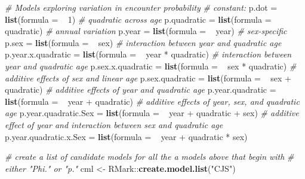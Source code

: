 \documentclass[]{article}
\newenvironment{Shaded}{\begin{snugshade}}{\end{snugshade}}
\newcommand{\KeywordTok}[1]{\textcolor[rgb]{0.13,0.29,0.53}{\textbf{{#1}}}}
\newcommand{\DataTypeTok}[1]{\textcolor[rgb]{0.13,0.29,0.53}{{#1}}}
\newcommand{\DecValTok}[1]{\textcolor[rgb]{0.00,0.00,0.81}{{#1}}}
\newcommand{\StringTok}[1]{\textcolor[rgb]{0.31,0.60,0.02}{{#1}}}
\newcommand{\CommentTok}[1]{\textcolor[rgb]{0.56,0.35,0.01}{\textit{{#1}}}}
\newcommand{\NormalTok}[1]{{#1}}
\begin{document}
\begin{Shaded}
\begin{Highlighting}[]
    \CommentTok{# Models exploring variation in encounter probability}
    \CommentTok{# constant:}
    \NormalTok{p.dot =}\StringTok{ }\KeywordTok{list}\NormalTok{(}\DataTypeTok{formula =} \NormalTok{~}\StringTok{ }\DecValTok{1}\NormalTok{)}
    \CommentTok{# quadratic across age}
    \NormalTok{p.quadratic =}\StringTok{ }\KeywordTok{list}\NormalTok{(}\DataTypeTok{formula =} \NormalTok{~}\StringTok{ }\NormalTok{quadratic)}
    \CommentTok{# annual variation}
    \NormalTok{p.year =}\StringTok{ }\KeywordTok{list}\NormalTok{(}\DataTypeTok{formula =} \NormalTok{~}\StringTok{ }\NormalTok{year)}
    \CommentTok{# sex-specific}
    \NormalTok{p.sex =}\StringTok{ }\KeywordTok{list}\NormalTok{(}\DataTypeTok{formula =} \NormalTok{~}\StringTok{ }\NormalTok{sex)}
    \CommentTok{# interaction between year and quadratic age}
    \NormalTok{p.year.x.quadratic =}\StringTok{ }\KeywordTok{list}\NormalTok{(}\DataTypeTok{formula =} \NormalTok{~}\StringTok{ }\NormalTok{year *}\StringTok{ }\NormalTok{quadratic)}
    \CommentTok{# interaction between year and quadratic age}
    \NormalTok{p.sex.x.quadratic =}\StringTok{ }\KeywordTok{list}\NormalTok{(}\DataTypeTok{formula =} \NormalTok{~}\StringTok{ }\NormalTok{sex *}\StringTok{ }\NormalTok{quadratic)}
    \CommentTok{# additive effects of sex and linear age}
    \NormalTok{p.sex.quadratic =}\StringTok{ }\KeywordTok{list}\NormalTok{(}\DataTypeTok{formula =} \NormalTok{~}\StringTok{ }\NormalTok{sex +}\StringTok{ }\NormalTok{quadratic)}
    \CommentTok{# additive effects of year and quadratic age}
    \NormalTok{p.year.quadratic =}\StringTok{ }\KeywordTok{list}\NormalTok{(}\DataTypeTok{formula =} \NormalTok{~}\StringTok{ }\NormalTok{year +}\StringTok{ }\NormalTok{quadratic)}
    \CommentTok{# additive effects of year, sex, and quadratic age}
    \NormalTok{p.year.quadratic.Sex =}\StringTok{ }\KeywordTok{list}\NormalTok{(}\DataTypeTok{formula =} \NormalTok{~}\StringTok{ }\NormalTok{year +}\StringTok{ }\NormalTok{quadratic +}\StringTok{ }\NormalTok{sex)}
    \CommentTok{# additive effect of year and interaction between sex and quadratic age}
    \NormalTok{p.year.quadratic.x.Sex =}\StringTok{ }\KeywordTok{list}\NormalTok{(}\DataTypeTok{formula =} \NormalTok{~}\StringTok{ }\NormalTok{year +}\StringTok{ }\NormalTok{quadratic *}\StringTok{ }\NormalTok{sex)}

    \CommentTok{# create a list of candidate models for all the a models above that begin with }
    \CommentTok{# either "Phi." or "p."}
    \NormalTok{cml <-}\StringTok{  }\NormalTok{RMark::}\KeywordTok{create.model.list}\NormalTok{(}\StringTok{"CJS"}\NormalTok{)}
    

\end{Highlighting}
\end{Shaded}
\end{document}
